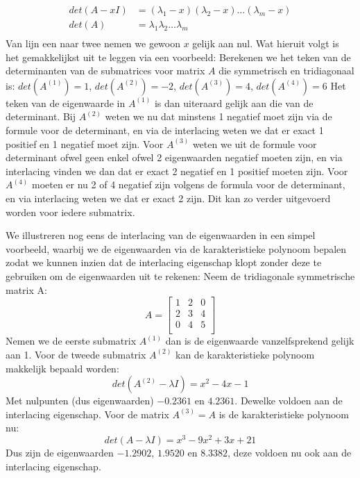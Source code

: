 \documentclass[a4paper]{article}
\begin{document}
	\begin{align*}
		det(A - xI) &= (\lambda _1 - x)(\lambda _2 - x) \dots (\lambda _m - x)\\
		det(A) &= \lambda _1 \lambda _2 \dots \lambda _m\\ 
	\end{align*}
	Van lijn een naar twee nemen we gewoon $x$ gelijk aan nul.
	Wat hieruit volgt is het gemakkelijkst uit te leggen via een voorbeeld:
	Berekenen we het teken van de determinanten van de submatrices voor matrix $A$ die symmetrisch en tridiagonaal is:
	$ det(A^{(1)}) = 1$, $det(A^{(2)}) = -2$, $det(A^{(3)}) = 4$, $det(A^{(4)}) = 6 $
	Het teken van de eigenwaarde in $A^{(1)}$ is dan uiteraard gelijk aan die van de determinant. Bij $A^{(2)}$ weten we nu dat minstens 1 negatief moet zijn via de formule voor de determinant, en via de interlacing weten we dat er exact 1 positief en 1 negatief moet zijn. Voor $A^{(3)}$ weten we uit de formule voor determinant ofwel geen enkel ofwel 2 eigenwaarden negatief moeten zijn, en via interlacing vinden we dan dat er exact 2 negatief en 1 positief moeten zijn. Voor $A^{(4)}$ moeten er nu 2 of 4 negatief zijn volgens de formula voor de determinant, en via interlacing weten we dat er exact 2 zijn. Dit kan zo verder uitgevoerd worden voor iedere submatrix.
	
	\noindent We illustreren nog eens de interlacing van de eigenwaarden in een simpel voorbeeld, waarbij we de eigenwaarden via de karakteristieke polynoom bepalen zodat we kunnen inzien dat de interlacing eigenschap klopt zonder deze te gebruiken om de eigenwaarden uit te rekenen: 
	Neem de tridiagonale symmetrische matrix A:
	\[ A =
		\begin{bmatrix*}
			1 & 2 & 0 \\
			2 & 3 & 4 \\
			0 & 4 & 5 \\ 
		\end{bmatrix*}
	\]
	Nemen we de eerste submatrix $A^{(1)}$ dan is de eigenwaarde vanzelfsprekend gelijk aan 1.
	Voor de tweede submatrix $A^{(2)}$ kan de karakteristieke polynoom makkelijk bepaald worden: 
	\[
		det(A^{(2)} - \lambda I) = x^2 - 4x - 1 
	\]
	Met nulpunten (dus eigenwaarden) $-0.2361$ en $4.2361$. Dewelke voldoen aan de interlacing eigenschap.
	Voor de matrix $A^{(3)} = A$ is de karakteristieke polynoom nu:
	\[
		det(A - \lambda I) = x^3 -9x^2 + 3x + 21
	\]
	Dus zijn de eigenwaarden $-1.2902$, $1.9520$ en $8.3382$, deze voldoen nu ook aan de interlacing eigenschap.
		
\end{document}
